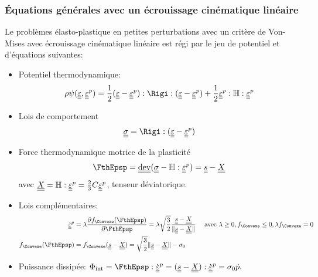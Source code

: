 \documentclass[10pt]{book}
\begin{document}
\begin{appendices}
\subsubsection{Équations générales avec un écrouissage cinématique linéaire}
Le problèmes élasto-plastique en petites perturbations avec un critère de Von-Mises avec écrouissage cinématique linéaire est régi par le jeu de potentiel et d'équations suivantes:
\begin{itemize}
\item Potentiel thermodynamique:
$$\rho \eHelm(\DefoHPP,\EpsP)=\frac{1}{2}(\DefoHPP-\EpsP):\Rigi:(\DefoHPP-\EpsP)+\frac{1}{2}\EpsP:\TenEcroui:\EpsP$$
\item Lois de comportement
$$\SC =\Rigi:(\DefoHPP-\EpsP)$$
\item Force thermodynamique motrice de la plasticité
$$\FthEpsp=\dev(\SC-\TenEcroui:\EpsP)=\devia-\TenTranslatDom$$
avec $\underline{\underline{X}}=\mathbb{H}:\underline{\underline{\varepsilon}}^p=\frac{2}{3}C\underline{\underline{\varepsilon}}^p$, tenseur déviatorique.
\item Lois complémentaires:
$$\begin{aligned}
\dot{\DefoHPP}^{p}&=\lambda\frac{\partial \FChargeConvexe(\FthEpsp)}{\partial \FthEpsp}=\lambda\sqrt{\frac{3}{2}}\frac{\devia-\TenTranslatDom}{\Vert \devia-\TenTranslatDom\Vert} \quad \avec \lambda\geq 0, \FChargeConvexe\leq 0, \lambda\FChargeConvexe=0\\
\FChargeConvexe(\FthEpsp)&=\FChargeConvexe(\devia-\TenTranslatDom)=\sqrt{\frac{3}{2}}\Vert \devia-\TenTranslatDom\Vert-\sigma_{0}
\end{aligned}$$
\item Puissance dissipée: $\dint=\FthEpsp:\dot{\DefoHPP}^{p}=(\devia-\TenTranslatDom):\dot{\DefoHPP}^{p}= \sigma_{0}\dot{p}.$
\end{itemize}

\end{appendices}
\end{document}
